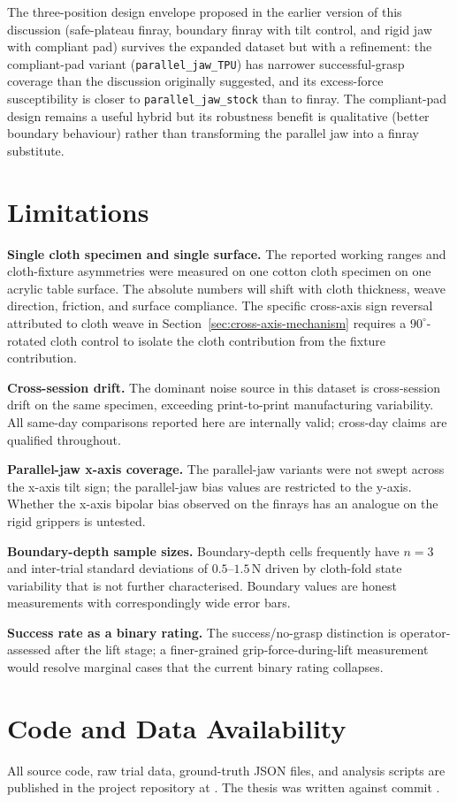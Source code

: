 The three-position design envelope proposed in the earlier version of
this discussion (safe-plateau finray, boundary finray with tilt
control, and rigid jaw with compliant pad) survives the expanded
dataset but with a refinement: the compliant-pad variant
(\texttt{parallel\_jaw\_TPU}) has narrower successful-grasp coverage
than the discussion originally suggested, and its excess-force
susceptibility is closer to \texttt{parallel\_jaw\_stock} than to
finray. The compliant-pad design remains a useful hybrid but its
robustness benefit is qualitative (better boundary behaviour) rather
than transforming the parallel jaw into a finray substitute.

\section{Limitations}
\label{sec:limitations}

\textbf{Single cloth specimen and single surface.} The reported working
ranges and cloth-fixture asymmetries were measured on one cotton cloth
specimen on one acrylic table surface. The absolute numbers will shift
with cloth thickness, weave direction, friction, and surface compliance.
The specific cross-axis sign reversal attributed to cloth weave in
Section~\ref{sec:cross-axis-mechanism} requires a $90^{\circ}$-rotated
cloth control to isolate the cloth contribution from the fixture
contribution.

\textbf{Cross-session drift.} The dominant noise source in this
dataset is cross-session drift on the same specimen, exceeding
print-to-print manufacturing variability. All same-day comparisons
reported here are internally valid; cross-day claims are qualified
throughout.

\textbf{Parallel-jaw x-axis coverage.} The parallel-jaw variants were
not swept across the x-axis tilt sign; the parallel-jaw bias values
are restricted to the y-axis. Whether the x-axis bipolar bias observed
on the finrays has an analogue on the rigid grippers is untested.

\textbf{Boundary-depth sample sizes.} Boundary-depth cells frequently
have $n=3$ and inter-trial standard deviations of $0.5$--$1.5$\,N
driven by cloth-fold state variability that is not further
characterised. Boundary values are honest measurements with
correspondingly wide error bars.

\textbf{Success rate as a binary rating.} The success/no-grasp
distinction is operator-assessed after the lift stage; a
finer-grained grip-force-during-lift measurement would resolve
marginal cases that the current binary rating collapses.

\section{Code and Data Availability}

All source code, raw trial data, ground-truth JSON files, and analysis
scripts are published in the project repository at
. The thesis was written against commit
.
